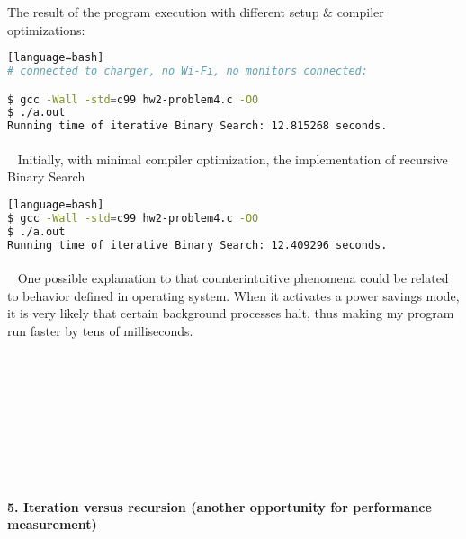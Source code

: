 \documentclass{article}
\begin{document}
\noindent The result of the program execution with different setup \& compiler optimizations:



	
	\ttfamily
	\begin{lstlisting}[basicstyle=\small, language=bash][language=bash]
# connected to charger, no Wi-Fi, no monitors connected:

$ gcc -Wall -std=c99 hw2-problem4.c -O0
$ ./a.out
Running time of iterative Binary Search: 12.815268 seconds.
	\end{lstlisting}

\paragraph{}\
	\rmfamily
	Initially, with minimal compiler optimization, the implementation of recursive Binary Search

	\ttfamily
	\begin{lstlisting}[basicstyle=\small, language=bash][language=bash]	
$ gcc -Wall -std=c99 hw2-problem4.c -O0
$ ./a.out
Running time of iterative Binary Search: 12.409296 seconds.
	\end{lstlisting}
	
	\paragraph{}\
	\rmfamily
	One possible explanation to that counterintuitive phenomena could be related to behavior defined in operating system. When it activates a power savings mode, it is very likely that certain background processes halt, thus making my program run faster by tens of milliseconds.

\paragraph{}\
\paragraph{}\
\paragraph{}\
\paragraph{}\

	
	\rmfamily
	
	\paragraph{5. Iteration versus recursion (another opportunity for performance measurement) }\
	
\end{document}
